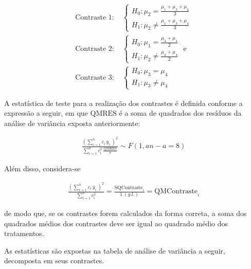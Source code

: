 \documentclass[
]{article}
\begin{document}
\begin{align*}
  \text{Contraste 1: }&\begin{cases}
    H_0: \mu_2 = \frac{\mu_1+\mu_3+\mu_4}{3}\\
    H_1: \mu_2 \neq \frac{\mu_1+\mu_3+\mu_4}{3}
  \end{cases}\\
  \text{Contraste 2: }&\begin{cases}
    H_0: \mu_1 = \frac{\mu_3+\mu_4}{2}\\
    H_1: \mu_2 \neq \frac{\mu_3+\mu_4}{2}
  \end{cases} 
  \text{ e }\\
  \text{Contraste 3: }&\begin{cases}
    H_0: \mu_3 = \mu_4\\
    H_1: \mu_3 \neq \mu_4
  \end{cases}
\end{align*}

A estatística de teste para a realização dos contrastes é definida
conforme a expressão a seguir, em que \(\text{QMRES}\) é a soma de
quadrados dos resíduos da análise de variância exposta anteriormente:

\begin{align*}
  \frac{\left( \sum\limits_{i = 1}^n c_i \, \bar{y}_{i.}\right)^2}{ \sum\limits_{i = 1}^n c_i^2 \, \frac{\text{QMRES}}{n}} \sim F(1, an-a = 8)
\end{align*}

Além disso, considera-se

\begin{align*}
  \frac{\left( \sum\limits_{i = 1}^n c_i \, \bar{y}_{i.}\right)^2}{\sum\limits_{i = 1}^n c_i^2} = \frac{\text{SQContraste}_i}{1 \, (g.l.)} = \text{QMContraste}_i
\end{align*}

de modo que, se os contrastes forem calculados da forma correta, a soma
dos quadrados médios dos contrastes deve ser igual ao quadrado médio dos
tratamentos.

As estatísticas são expostas na tabela de análise de variância a seguir,
decomposta em seus contrastes.
\end{document}
